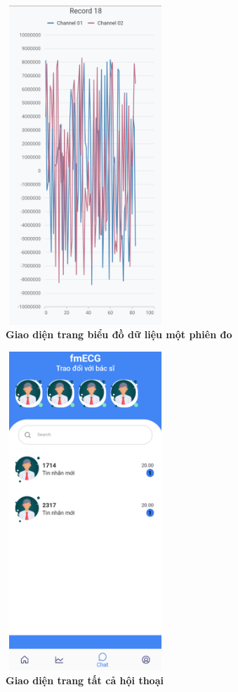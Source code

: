 \begin{figure}[H]
  \centering
  \includegraphics[width=6cm,height=12cm]{Images/mobile_app/demo/detail_record.png}
  \caption[Giao diện trang biểu đồ dữ liệu một phiên đo]{\bfseries \fontsize{12pt}{0pt}\selectfont Giao diện trang biểu đồ dữ liệu một phiên đo}
  \label{demo_} %
\end{figure}

\begin{figure}[H]
  \centering
  \includegraphics[width=6cm,height=12cm]{Images/mobile_app/demo/chat_preview.png}
  \caption[Giao diện trang tất cả hội thoại]{\bfseries \fontsize{12pt}{0pt}\selectfont Giao diện trang tất cả hội thoại}
  \label{demo_} %
\end{figure}

